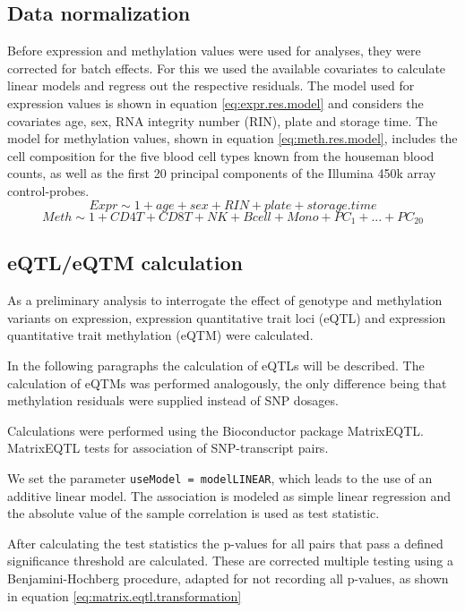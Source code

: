 \documentclass[a4paper,12pt,twoside,openright]{article}
\begin{document}
\subsection{Data normalization}
\label{Methods:Data normalization}
Before expression and methylation values were used for analyses, they were corrected for batch effects. For this we used the available covariates to calculate linear models and regress out the respective residuals. The model used for expression values is shown in equation \ref{eq:expr.res.model} and considers the covariates age, sex, RNA integrity number (RIN), plate and storage time. The model for methylation values, shown in equation \ref{eq:meth.res.model},
includes the cell composition for the five blood cell types known from the houseman blood counts, as well as the first 20 principal components of the Illumina 450k array control-probes. 
\begin{equation}
\label{eq:expr.res.model}
Expr \sim 1+age+sex+RIN+plate+storage.time
\end{equation}
\begin{equation}
\label{eq:meth.res.model}
Meth \sim 1+CD4T+CD8T+NK+Bcell+Mono+PC_1+...+PC_{20}
\end{equation}


\subsection{eQTL/eQTM calculation}
\label{Methods:eQTL/eQTM calculation}
As a preliminary analysis to interrogate the effect of genotype and methylation variants on expression, expression quantitative trait loci (eQTL) and expression quantitative trait methylation (eQTM) were calculated.

In the following paragraphs the calculation of eQTLs will be described. The calculation of eQTMs was performed analogously, the only difference being that methylation residuals were supplied instead of SNP dosages.

Calculations were performed using the Bioconductor package MatrixEQTL\cite{10.1093/bioinformatics/bts163}. MatrixEQTL tests for association of SNP-transcript pairs.  

We set the parameter \texttt{useModel = modelLINEAR}, which leads to the use of an  additive linear model. The association is modeled as simple linear regression and the absolute value of the sample correlation is used as test statistic.

After calculating the test statistics the p-values for all pairs that pass a defined significance threshold are calculated. These are corrected multiple testing using a Benjamini-Hochberg procedure\cite{10.2307/2346101}, adapted for not recording all p-values, as shown in equation \ref{eq:matrix.eqtl.transformation}
\end{document}
